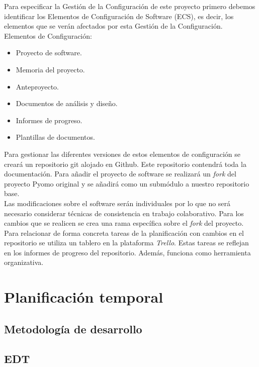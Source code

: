 Para especificar la Gestión de la Configuración de este proyecto primero debemos identificar los Elementos de Configuración de Software (ECS), es decir, los elementos que se verán afectados por esta Gestión de la Configuración.\\

Elementos de Configuración:
\begin{itemize}
    \item Proyecto de software.
    \item Memoria del proyecto.
    \item Anteproyecto.
    \item Documentos de análisis y diseño.
    \item Informes de progreso.
    \item Plantillas de documentos.
\end{itemize}

Para gestionar las diferentes versiones de estos elementos de configuración se creará un repositorio git alojado en Github. Este repositorio contendrá toda la documentación. Para añadir el proyecto de software se realizará un \textit{fork} del proyecto Pyomo original y se añadirá como un submódulo a nuestro repositorio base. \\

Las modificaciones sobre el software serán individuales por lo que no será necesario considerar técnicas de consistencia en trabajo colaborativo. Para los cambios que se realicen se crea una rama específica sobre el \textit{fork} del proyecto.\\

Para relacionar de forma concreta tareas de la planificación con cambios en el repositorio se utiliza un tablero en la plataforma \textit{Trello}. Estas tareas se reflejan en los informes de progreso del repositorio. Además, funciona como herramienta organizativa.

\section{Planificación temporal}

\subsection{Metodología de desarrollo}


\subsection{EDT}


